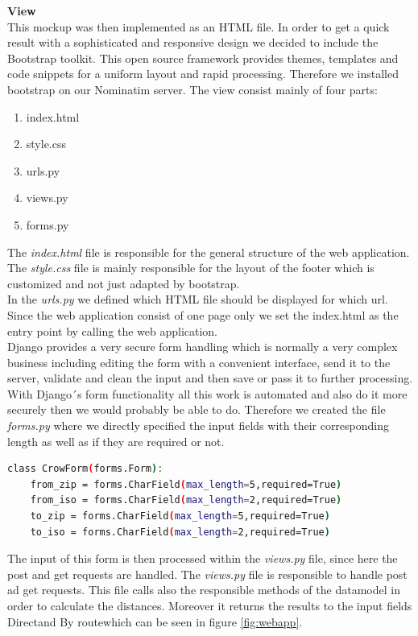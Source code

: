 \documentclass[12pt]{article}
\begin{document}
\textbf{View}\\
This mockup was then implemented as an HTML file. In order to get a quick result with a sophisticated and responsive design we decided to include the Bootstrap toolkit. This open source framework provides themes, templates and code snippets for a uniform layout and rapid processing. Therefore we installed bootstrap on our Nominatim server. 
The view consist mainly of four parts:
\begin{enumerate}
\item index.html
\item style.css
\item urls.py
\item views.py
\item forms.py
\end{enumerate}
The \emph{index.html} file is responsible for the general structure of the web application. The \emph{style.css} file is mainly responsible for the layout of the footer which is customized and not just adapted by bootstrap. \\
In the \emph{urls.py} we defined which HTML file should be displayed for which url. Since the web application consist of one page only we set the index.html as the entry point by calling the web application. \\
Django provides a very secure form handling which is normally a very complex business including editing the form with a convenient interface, send it to the server, validate and clean the input and then save or pass it to further processing. With Django´s form functionality all this work is automated and also do it more securely then we would probably be able to do.
Therefore we created the file \emph{forms.py} where we directly specified the input fields with their corresponding length as well as if they are required or not.
\begin{lstlisting}[language=bash,breaklines=true]
class CrowForm(forms.Form):
    from_zip = forms.CharField(max_length=5,required=True)
    from_iso = forms.CharField(max_length=2,required=True)
    to_zip = forms.CharField(max_length=5,required=True)
    to_iso = forms.CharField(max_length=2,required=True)
    \end{lstlisting}
The input of this form is then processed within the \emph{views.py} file, since here the post and get requests are handled.
The \emph{views.py} file is responsible to handle post ad get requests.
This file calls also the responsible methods of the datamodel in order to calculate the distances. 
Moreover it returns the results to the input fields \glqq Direct\grqq and \glqq By route\grqq which can be seen in figure \ref{fig:webapp}.
\end{document}

